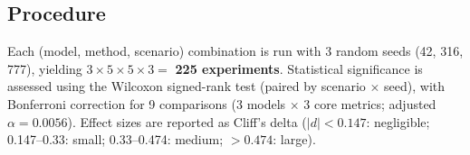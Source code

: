 \subsection{Procedure}

Each (model, method, scenario) combination is run with 3 random seeds (42, 316, 777), yielding $3 \times 5 \times 5 \times 3 = $ \textbf{225 experiments}. Statistical significance is assessed using the Wilcoxon signed-rank test (paired by scenario $\times$ seed), with Bonferroni correction for 9 comparisons (3 models $\times$ 3 core metrics; adjusted $\alpha = 0.0056$). Effect sizes are reported as Cliff's delta ($|d| < 0.147$: negligible; 0.147--0.33: small; 0.33--0.474: medium; $> 0.474$: large).
